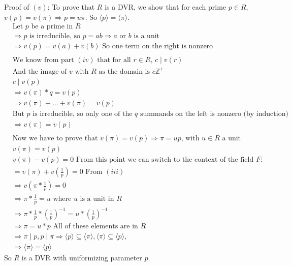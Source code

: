 \documentclass[11pt]{article}
\newcommand{\B}[1]{%
	\mathbb{#1}
}
\begin{document}
{Proof of $(v)$:
To prove that $R$ is a DVR, we show that for each prime $p \in R$, $v(p) = v(\pi) \Rightarrow p = u\pi$. So $\langle p \rangle = \langle \pi \rangle$.
\begin{align*}
&\text{Let $p$ be a prime in $R$}\\
&\Rightarrow p \text{ is irreducible, so } p = ab \Rightarrow \text{$a$ or $b$ is a unit}\\
&\Rightarrow v(p) = v(a) + v(b) \text{ So one term on the right is nonzero}\\
&\\
&\text{We know from part $(iv)$ that for all $r \in R$, $c \mid v(r)$}\\
&\text{And the image of $v$ with $R$ as the domain is $c\B{Z}^+$}\\
&c \mid v(p)\\
&\Rightarrow v(\pi)*q = v(p)\\
&\Rightarrow v(\pi) + ... + v(\pi) = v(p)\\
&\text{But $p$ is irreducible, so only one of the $q$ summands on the left is nonzero (by induction)}\\
&\Rightarrow v(\pi) = v(p)\\
&\\
&\text{Now we have to prove that $v(\pi) = v(p) \Rightarrow \pi = up$, with $u \in R$ a unit}\\
&v(\pi) = v(p)\\
&v(\pi) - v(p) = 0 \text{ From this point we can switch to the context of the field $F$}:\\
&= v(\pi) + v(\frac{1}{p}) = 0 \text{ From $(iii)$}\\
&\Rightarrow v(\pi * \frac{1}{p}) = 0\\
&\Rightarrow \pi * \frac{1}{p} = u \text{ where $u$ is a unit in $R$}\\
&\Rightarrow \pi * \frac{1}{p} * \left( \frac{1}{p} \right) ^{-1} = u * \left( \frac{1}{p} \right) ^{-1}\\
&\Rightarrow \pi = u*p \text{ All of these elements are in $R$}\\
&\Rightarrow \pi \mid p, p \mid \pi \Rightarrow \langle p \rangle \subseteq \langle \pi \rangle, \langle \pi \rangle \subseteq \langle p \rangle,\\
&\Rightarrow \langle \pi \rangle = \langle p \rangle
\end{align*}
So $R$ is a DVR with uniformizing parameter $p$.

}
\end{document}
